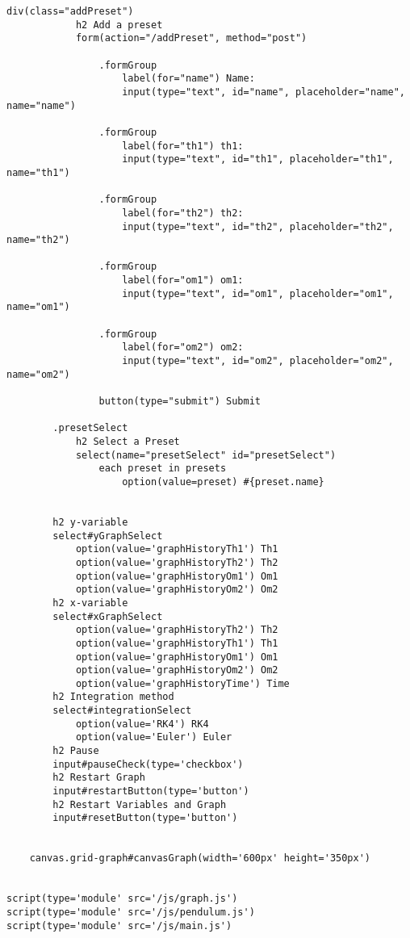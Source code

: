 \documentclass[12pt]{article}
\begin{document}
\begin{lstlisting}[language=pug]
        div(class="addPreset")
            h2 Add a preset
            form(action="/addPreset", method="post")

                .formGroup
                    label(for="name") Name: 
                    input(type="text", id="name", placeholder="name", name="name")

                .formGroup
                    label(for="th1") th1: 
                    input(type="text", id="th1", placeholder="th1", name="th1")

                .formGroup
                    label(for="th2") th2: 
                    input(type="text", id="th2", placeholder="th2", name="th2")

                .formGroup
                    label(for="om1") om1: 
                    input(type="text", id="om1", placeholder="om1", name="om1")

                .formGroup
                    label(for="om2") om2: 
                    input(type="text", id="om2", placeholder="om2", name="om2")

                button(type="submit") Submit

        .presetSelect
            h2 Select a Preset
            select(name="presetSelect" id="presetSelect")
                each preset in presets 
                    option(value=preset) #{preset.name}

            
        h2 y-variable
        select#yGraphSelect
            option(value='graphHistoryTh1') Th1
            option(value='graphHistoryTh2') Th2
            option(value='graphHistoryOm1') Om1
            option(value='graphHistoryOm2') Om2
        h2 x-variable
        select#xGraphSelect
            option(value='graphHistoryTh2') Th2
            option(value='graphHistoryTh1') Th1
            option(value='graphHistoryOm1') Om1
            option(value='graphHistoryOm2') Om2
            option(value='graphHistoryTime') Time
        h2 Integration method
        select#integrationSelect
            option(value='RK4') RK4
            option(value='Euler') Euler
        h2 Pause
        input#pauseCheck(type='checkbox')
        h2 Restart Graph
        input#restartButton(type='button')
        h2 Restart Variables and Graph
        input#resetButton(type='button')


    canvas.grid-graph#canvasGraph(width='600px' height='350px')


script(type='module' src='/js/graph.js')
script(type='module' src='/js/pendulum.js')
script(type='module' src='/js/main.js')
\end{lstlisting}
\end{document}
